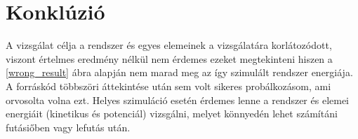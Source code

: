 \section{Konklúzió}
A vizsgálat célja a rendszer és egyes elemeinek a vizsgálatára korlátozódott, viszont értelmes eredmény nélkül nem érdemes ezeket megtekinteni hiszen a \ref{wrong_result} ábra alapján nem marad meg az így szimulált rendszer energiája. A forráskód többszöri áttekintése után sem volt sikeres probálkozásom, ami orvosolta volna ezt. Helyes szimuláció esetén érdemes lenne a rendszer és elemei energiáit (kinetikus és potenciál) vizsgálni, melyet könnyedén lehet számítáni futásiőben vagy lefutás után.